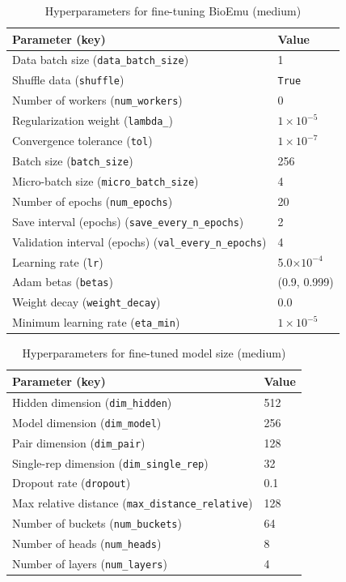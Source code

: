 \documentclass{article}
\theoremstyle{plain}
\theoremstyle{definition}
\theoremstyle{remark}
\begin{document}
\newpage

\begin{table}[!ht]
\centering
\caption{Hyperparameters for fine-tuning BioEmu (medium)}
\label{tab:finetune_medium_hyperparameters}
\begin{tabular}{ll}
\toprule
Parameter (key) & Value \\
\midrule
Data batch size (\texttt{data\_batch\_size}) & 1 \\
Shuffle data (\texttt{shuffle}) & \texttt{True} \\
Number of workers (\texttt{num\_workers}) & 0 \\
Regularization weight (\texttt{lambda\_}) & $1\times10^{-5}$ \\
Convergence tolerance (\texttt{tol}) & $1\times10^{-7}$ \\
Batch size (\texttt{batch\_size}) & 256 \\
Micro-batch size (\texttt{micro\_batch\_size}) & 4 \\
Number of epochs (\texttt{num\_epochs}) & 20 \\
Save interval (epochs) (\texttt{save\_every\_n\_epochs}) & 2 \\
Validation interval (epochs) (\texttt{val\_every\_n\_epochs}) & 4 \\
Learning rate (\texttt{lr}) & 5.0$\times10^{-4}$ \\
Adam betas (\texttt{betas}) & (0.9, 0.999) \\
Weight decay (\texttt{weight\_decay}) & 0.0 \\
Minimum learning rate (\texttt{eta\_min}) & $1\times10^{-5}$ \\
\bottomrule
\end{tabular}
\end{table}

\begin{table}[!ht]
\centering
\caption{Hyperparameters for fine-tuned model size (medium)}
\label{tab:finetune_model_size_medium_hyperparameters}
\begin{tabular}{ll}
\toprule
Parameter (key) & Value \\
\midrule
Hidden dimension (\texttt{dim\_hidden}) & 512 \\
Model dimension (\texttt{dim\_model}) & 256 \\
Pair dimension (\texttt{dim\_pair}) & 128 \\
Single-rep dimension (\texttt{dim\_single\_rep}) & 32 \\
Dropout rate (\texttt{dropout}) & 0.1 \\
Max relative distance (\texttt{max\_distance\_relative}) & 128 \\
Number of buckets (\texttt{num\_buckets}) & 64 \\
Number of heads (\texttt{num\_heads}) & 8 \\
Number of layers (\texttt{num\_layers}) & 4 \\
\bottomrule
\end{tabular}
\end{table}
\end{document}
